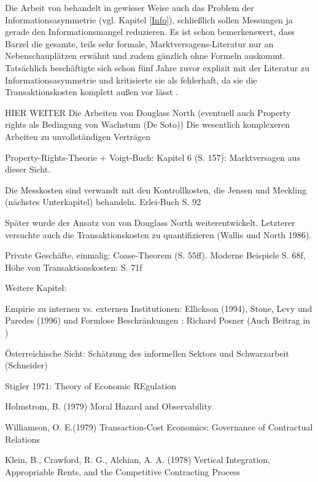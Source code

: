 Die Arbeit von \Textcite{Barzel1982} behandelt in gewisser Weise auch das Problem der Informationsasymmetrie (vgl. Kapitel \ref{Info}), schließlich sollen Messungen ja gerade den Informationsmangel reduzieren. Es ist schon bemerkenswert, dass Barzel die gesamte, teils sehr formale, Marktversagens-Literatur nur an Nebenschauplätzen erwähnt und zudem gänzlich ohne Formeln auskommt. Tatsächlich beschäftigte sich \textcite{Barzel1977} schon fünf Jahre zuvor explizit mit der Literatur zu Informationsasymmetrie und kritisierte sie als fehlerhaft, da sie die Transaktionskosten komplett außen vor lässt \parencite[S. 6]{Allen2024}. 

HIER WEITER
Die Arbeiten von Douglass North (eventuell auch Property rights als Bedingung von Wachstum (De Soto))
Die wesentlich komplexeren Arbeiten zu unvollständigen Verträgen




\parencite[S. 284]{Erlei2016}
Property-Rights-Theorie + Voigt-Buch: Kapitel 6 (S. 157): Marktversagen aus dieser Sicht.




Die Messkosten sind verwandt mit den Kontrollkosten, die Jensen und Meckling (nächstes Unterkapitel) behandeln.
Erlei-Buch S. 92

Später wurde der Ansatz von von Douglass North weiterentwickelt. Letzterer versuchte auch die Transaktionskosten zu quantifizieren (Wallis und North 1986).






Private Geschäfte, einmalig: Coase-Theorem (S. 55ff). Moderne Beispiele S. 68f, Höhe von Transaktionskosten: S. 71f


Weitere Kapitel: 

Empirie zu internen vs. externen Institutionen: Ellickson (1994), Stone, Levy und Paredes (1996) und Formlose Beschränkungen \parencite[S. 43]{North1990}: Richard Posner (Auch Beitrag in \textcite{Warsh})

Österreichische Sicht: Schätzung des informellen Sektors und Schwarzarbeit (Schneider)

Stigler 1971: Theory of Economic REgulation

Holmstrom, B. (1979) Moral Hazard and Observability

Williamson, O. E.(1979) Transaction-Cost Economics: Governance of Contractual Relations





Klein, B., Crawford, R. G., Alchian, A. A. (1978) Vertical Integration, Appropriable Rents, and the Competitive Contracting Process

